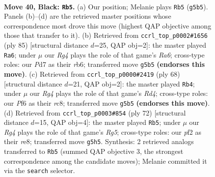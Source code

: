 \documentclass[11pt]{article}
\begin{document}
\clearpage

\begin{figure}[p]\centering
\begin{subfigure}{0.46\textwidth}\centering
\resizebox{\linewidth}{!}{%
\newchessgame
\chessboard[
  setfen={7k/p2p4/2p2p2/6r1/1P1P4/7K/5P1P/8 b - - 1 40},
  showmover=false,
  pgfstyle=straightmove, color=movearrow, markmove={g5-b5}
]}
\caption{}
\end{subfigure}\hfill
\begin{subfigure}{0.46\textwidth}\centering
\resizebox{\linewidth}{!}{%
\newchessgame
\chessboard[
  setfen={7k/1p4p1/1R1p3p/3P4/8/r7/4KPPP/8 b - - 1 43},
  showmover=false,
  pgfstyle=straightmove, color=movearrow, markmove={a3-a6}
]}
\caption{}
\end{subfigure}
\\[4pt]
\begin{subfigure}{0.46\textwidth}\centering
\resizebox{\linewidth}{!}{%
\newchessgame
\chessboard[
  setfen={2r5/8/4pk1p/1p6/3R1P2/P7/1P3K1P/8 w - - 0 35},
  showmover=false,
  pgfstyle=straightmove, color=movearrow, markmove={d4-b4}
]}
\caption{}
\end{subfigure}\hfill
\begin{subfigure}{0.46\textwidth}\centering
\resizebox{\linewidth}{!}{%
\newchessgame
\chessboard[
  setfen={4r3/5p2/1p3k2/6R1/3p3P/8/1PP2K2/8 w - - 0 37},
  showmover=false,
  pgfstyle=straightmove, color=movearrow, markmove={g5-b5}
]}
\caption{}
\end{subfigure}
\caption{\textbf{Move 40, Black: \texttt{Rb5}.} (a) Our position; Melanie plays \texttt{Rb5} (\texttt{g5b5}). Panels (b)--(d) are the retrieved master positions whose correspondence most drove this move (highest QAP objective among those that transfer to it). (b) Retrieved from \texttt{ccrl\_top\_p0002\#1656} (ply 85) [structural distance $d$=25, QAP obj=2]: the master played \texttt{Ra6}; under $\mu$ our \emph{Rg4} plays the role of that game's \emph{Ra6}; cross-type roles: our \emph{P}d7 as their \emph{r}b6; transferred move \texttt{g5b5} \textbf{(endorses this move)}. (c) Retrieved from \texttt{ccrl\_top\_p0000\#2419} (ply 68) [structural distance $d$=21, QAP obj=2]: the master played \texttt{Rb4}; under $\mu$ our \emph{Rg4} plays the role of that game's \emph{Rd4}; cross-type roles: our \emph{P}f6 as their \emph{r}c8; transferred move \texttt{g5b5} \textbf{(endorses this move)}. (d) Retrieved from \texttt{ccrl\_top\_p0003\#854} (ply 72) [structural distance $d$=15, QAP obj=4]: the master played \texttt{Rb5}; under $\mu$ our \emph{Rg4} plays the role of that game's \emph{Rg5}; cross-type roles: our \emph{p}f2 as their \emph{r}e8; transferred move \texttt{g5h5}. Synthesis: 2 retrieved analogs transferred to \texttt{Rb5} (summed QAP objective 3, the strongest correspondence among the candidate moves); Melanie committed it via the \texttt{search} selector.}
\label{fig:thought-m79}
\end{figure}
\end{document}
